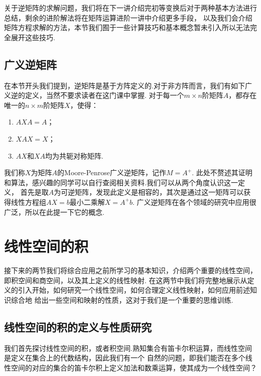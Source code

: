关于逆矩阵的求解问题，我们将在下一讲介绍完初等变换后对于两种基本方法进行总结，剩余的进阶解法将在矩阵运算进阶一讲中介绍更多手段，
以及我们会介绍矩阵方程求解的方法，本节我们囿于一些计算技巧和基本概念暂未引入所以无法完全展开这些技巧.

\subsection{广义逆矩阵}
在本节开头我们提到，逆矩阵是基于方阵定义的.对于非方阵而言，我们有如下广义逆的定义，当然不要求读者在这门课中掌握.
对于每一个$m \times n$阶矩阵$A$，都存在唯一的$n \times m$阶矩阵$X$，使得：
\begin{enumerate}
	\item $AXA=A$；
	\item $XAX=X$；
	\item $AX$和$XA$均为共轭对称矩阵.
\end{enumerate}
我们称$X$为矩阵$A$的Moore-Penrose广义逆矩阵，记作$M=A^+$.
此处不赘述其证明和算法，感兴趣的同学可以自行查阅相关资料.我们可以从两个角度认识这一定义，
首先是取$A$为可逆矩阵，发现此定义是相容的，其次是通过这一矩阵可以获得线性方程组$AX=b$最小二乘解$X=A^+b$.
广义逆矩阵在各个领域的研究中应用很广泛，所以在此提一下它的概念.

\section{线性空间的积}
接下来的两节我们将综合应用之前所学习的基本知识，介绍两个重要的线性空间，即积空间和商空间，以及其上定义的线性映射.
在这两节中我们将完整地展示从定义的引入开始，如何研究一个线性空间，如何合理定义线性映射，如何应用前述知识综合地
给出一些空间和映射的性质，这对于我们是一个重要的思维训练.

\subsection{线性空间的积的定义与性质研究}
我们首先探讨线性空间的积，或者积空间.熟知集合有笛卡尔积运算，而线性空间是定义在集合上的代数结构，因此我们有一个
自然的问题，即我们能否在多个线性空间的对应的集合的笛卡尔积上定义加法和数乘运算，使其成为一个线性空间？

